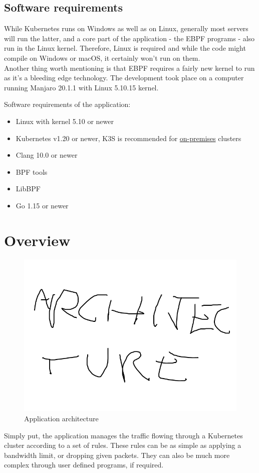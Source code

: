 \newpage
\subsection{Software requirements}
While Kubernetes runs on Windows as well as on Linux, generally most servers will run the latter, and a core part of the application - the EBPF programs - also run in the Linux kernel. Therefore, Linux is required and while the code might compile on Windows or macOS, it certainly won't run on them.\\
Another thing worth mentioning is that EBPF requires a fairly new kernel to run as it's a bleeding edge technology. The development took place on a computer running Manjaro 20.1.1 with Linux 5.10.15 kernel.
\bigbreak

\noindent
Software requirements of the application:
\begin{itemize}
	\item Linux with kernel\cite{linux-kernel} 5.10 or newer
	\item Kubernetes\cite{kubernetes} v1.20 or newer, K3S\cite{k3s} is recommended for \underline{\gls{on-premises}} clusters
	\item Clang\cite{clang} 10.0 or newer
	\item BPF tools\cite{bpf-1}
	\item LibBPF\cite{libbpf}
	\item Go\cite{go} 1.15 or newer
\end{itemize}

\newpage
\section{Overview}
\begin{figure}[H]
	\centering
	\includegraphics[width=\textwidth]{images/archi.png}
	\caption{Application architecture}
	\label{fig:app-arch}
\end{figure}
Simply put, the application manages the traffic flowing through a Kubernetes cluster according to a set of rules. These rules can be as simple as applying a bandwidth limit, or dropping given packets. They can also be much more complex through user defined programs, if required.
\bigbreak

